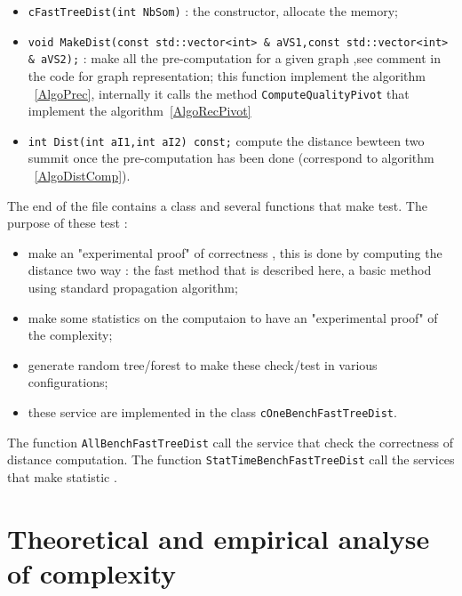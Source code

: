 \documentclass[a4paper]{article}
\begin{document}
\begin{itemize}
   \item {\tt cFastTreeDist(int NbSom)} : the constructor, allocate the memory;


   \item {\tt void MakeDist(const std::vector<int> \& aVS1,const std::vector<int> \& aVS2);} : make all the
         pre-computation for a given graph ,see comment in the code for graph representation;
         this function implement the algorithm ~\ref{AlgoPrec}, internally it calls the 
        method {\tt ComputeQualityPivot} that implement the algorithm~\ref{AlgoRecPivot}

   \item {\tt int Dist(int aI1,int aI2) const;}   compute the distance bewteen two summit once
        the pre-computation has been done (correspond to algorithm ~\ref{AlgoDistComp}).
\end{itemize}

The end of the file contains a class and several functions that make test. The purpose of these
test :

\begin{itemize}
   \item make an "experimental proof"  of  correctness , this is done by computing
       the distance two way : the fast method that is described here, a basic method
       using standard propagation algorithm; 

   \item make some statistics on the computaion to have an "experimental proof" of the complexity;

   \item generate random tree/forest to make these check/test in various configurations;
  
   \item these service are implemented in the class {\tt cOneBenchFastTreeDist}.
\end{itemize}


The function {\tt AllBenchFastTreeDist} call the service that check the correctness of distance computation.
The function {\tt StatTimeBenchFastTreeDist} call the services that make statistic .

    




\section{Theoretical and empirical analyse of complexity}
\end{document}
